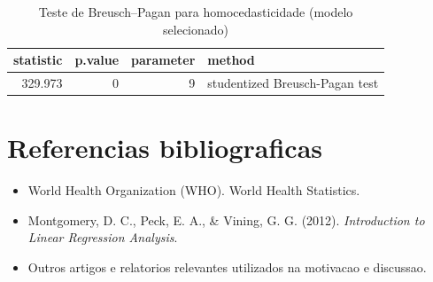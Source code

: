 \documentclass[
  12pt,
]{article}
\providecommand{\tightlist}{%
  \setlength{\itemsep}{0pt}\setlength{\parskip}{0pt}}
\begin{document}
\begin{longtable}[t]{rrrl}
\caption{\label{tab:unnamed-chunk-17}Teste de Breusch–Pagan para homocedasticidade (modelo selecionado)}\\
\toprule
statistic & p.value & parameter & method\\
\midrule
329.973 & 0 & 9 & studentized Breusch-Pagan test\\
\bottomrule
\end{longtable}

\section{Referencias bibliograficas}\label{referencias-bibliograficas}

\begin{itemize}
\tightlist
\item
  World Health Organization (WHO). World Health Statistics.\\
\item
  Montgomery, D. C., Peck, E. A., \& Vining, G. G. (2012).
  \emph{Introduction to Linear Regression Analysis}.\\
\item
  Outros artigos e relatorios relevantes utilizados na motivacao e
  discussao.
\end{itemize}
\end{document}
